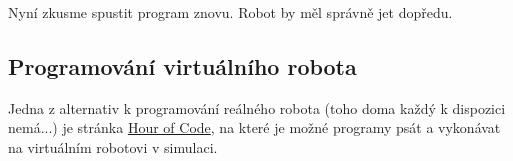 \documentclass[../main.tex]{subfiles}
\begin{document}
	\begin{figure}[h!]%
		\begin{subfigure}{.49\textwidth}%
			\centering%
		\end{subfigure} \hspace{.05\textwidth}%
		\begin{subfigure}{.49\textwidth}%
			\centering%
		\end{subfigure}%
	\end{figure}

	Nyní zkusme spustit program znovu. Robot by měl správně jet dopředu.

	\subsection{Programování virtuálního robota}
	Jedna z alternativ k programování reálného robota (toho doma každý k dispozici nemá...) je stránka \href{http://www.robotmesh.com/create/176384}{Hour of Code}, na které je možné programy psát a vykonávat na virtuálním robotovi v simulaci.
\end{document}
